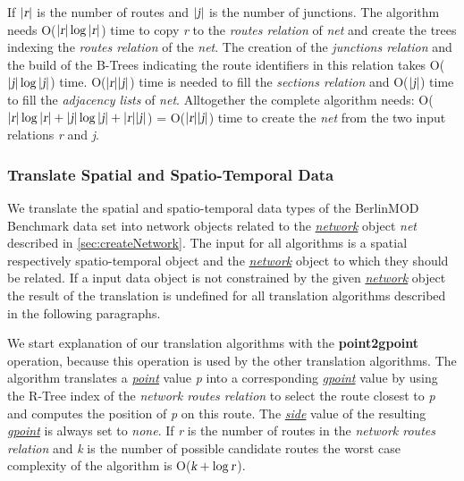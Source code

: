 \documentclass[a4paper]{article}
\newcommand{\bmodb} {BerlinMOD Benchmark}
\newcommand{\op}[1]{\textbf{#1}}
\newcommand{\var}[1]{\textsl{#1}}
\newcommand{\dt}[1]{\textsl{\underline{#1}}}
\begin{document}
{If $|\var{r}|$ is the number of routes and $|\var{j}|$ is the number of junctions. The algorithm needs O($|\var{r}| \log |\var{r}|$) time to copy \var{r} to the \var{routes relation} of \var{net} and create the trees indexing the \var{routes relation} of the \var{net}. The creation of the \var{junctions relation} and the build of the B-Trees indicating the route identifiers in this relation takes O($|\var{j}| \log |\var{j}|$) time. O($|\var{r}||\var{j}|$) time is needed to fill the \var{sections relation} and O($|\var{j}|$) time to fill the \var{adjacency lists} of \var{net}. Alltogether the complete algorithm needs: O($|\var{r}| \log |\var{r}|+|\var{j}| \log |\var{j}| + |\var{r}||\var{j}|$) = O($|\var{r}||\var{j}|$) time to create the \var{net} from the two input relations \var{r} and \var{j}.
\subsubsection{Translate Spatial and Spatio-Temporal Data}
\label{sec:translateSTdata}
We translate the spatial and spatio-temporal data types of the \bmodb{} data set into network objects related to the \dt{network} object \var{net} described in \ref{sec:createNetwork}. The input for all algorithms is a spatial respectively spatio-temporal object and the \dt{network} object to which they should be related. If a input data object is not constrained by the given \dt{network} object the result of the translation is undefined for all translation algorithms described in the following paragraphs.

We start explanation of our translation algorithms with the \op{point2gpoint} operation, because this operation is used by the other translation algorithms. The algorithm translates a \dt{point} value \var{p} into a corresponding \dt{gpoint} value by using the R-Tree index of the \var{network routes relation} to select the route closest to \var{p} and computes the position of \var{p} on this route. The \dt{side} value of the resulting \dt{gpoint} is always set to \var{none}. If \var{r} is the number of routes in the \var{network routes relation} and \var{k} is the number of possible candidate routes the worst case complexity of the algorithm is O($\var{k} + \log \var{r}$).

}
\end{document}
